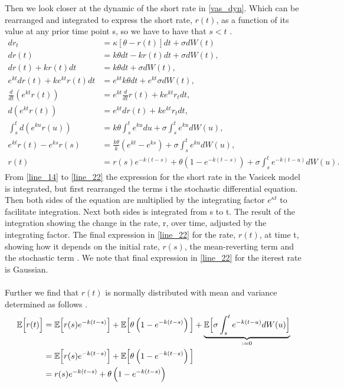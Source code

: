 \noindent
\newpage
\noindent
Then we look closer at the dynamic of the short rate in \autoref{vas_dyn}. Which can be rearranged and integrated
to express the short rate, $r(t)$, as a function of its value at any prior time point s, 
so we have to have that $s < t$ \cite{Bermudan}. 
\begin{align}
    d r_t &= \kappa \left[\theta - r(t)\right] dt + \sigma d W(t) \label{line_14} \\
    d r(t) &= k \theta dt - k r(t) dt + \sigma d W(t),  \\
    d r(t) + k r(t) dt &= k \theta dt + \sigma d W(t), \\
    e^{kt} d r(t) + k e^{kt} r(t) dt &= e^{kt} k \theta dt + e^{kt} \sigma d W(t), \\
    \frac{d}{dt} \left( e^{k t} r(t) \right) &= e^{k t} \frac{d}{dt} r(t) + k e^{k t} r_t dt, \\
    d\left( e^{k t} r(t) \right) &= e^{k t} dr(t) + k e^{k t} r_t dt, \\
    \int_s^t d \left( e^{ku} r(u) \right) &= k \theta \int_s^t e^{ku} du + \sigma \int_s^t e^{ku} d W(u), \\
    e^{kt} r(t) - e^{k s} r(s) &= \frac{k \theta}{k} \left( e^{kt} - e^{ks} \right) + \sigma \int_s^t e^{ku} d W(u), \\
    r(t) &= r(s) e^{-k(t-s)} + \theta \left( 1 - e^{-k(t-s)} \right) + \sigma \int_s^t e^{-k(t-u)} d W(u). \label{line_22}
\end{align}
From \autoref{line_14} to \autoref{line_22} the expression for the short rate in the Vasicek model is integrated, but first
rearranged the terms i the stochastic differential equation. Then both sides of the equation are multiplied by the 
integrating factor $e^{\kappa t}$ to facilitate integration. Next both sides is integrated from s to t. The result of the
integration showing the change in the  rate, r, over time, adjusted by the integrating factor. The final 
expression in \autoref{line_22} for the  rate, $r(t)$, at time t, showing how it depends on the initial rate, $r(s)$,
the mean-reverting term and the stochastic term \cite{Bermudan}. We note that  final expression in \autoref{line_22} for the iterest rate
is Gaussian.
\\\\
Further we find that $r(t)$ is normally distributed with mean and variance determined as follows \cite{Bjork}. 
\begin{align*}
    \mathbb{E} \Big[r(t)\Big] & = \mathbb{E} \Big[ r(s) e^{-k(t-s)} \Big] + \mathbb{E} \Big[\theta \left( 1 - e^{-k(t-s)} \right)\Big]
    + \underset{:=0}{\underbrace{\mathbb{E} \Big[\sigma \int_s^t e^{-k(t-u)} d W(u)\Big] }}\\
    & = \mathbb{E} \Big[ r(s) e^{-k(t-s)} \Big] + \mathbb{E} \Big[\theta \left( 1 - e^{-k(t-s)} \right)\Big] \\
    & = r(s) e^{-k(t-s)} + \theta \left( 1 - e^{-k(t-s)} \right) 
\end{align*}    
